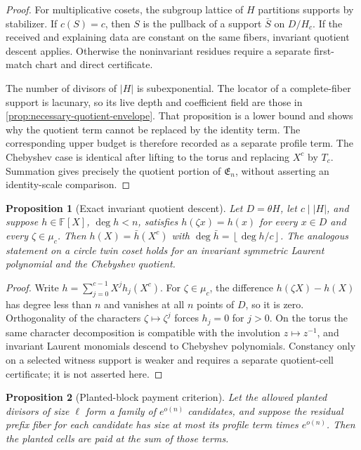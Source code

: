 \documentclass[12pt,a4paper]{amsart}
\numberwithin{equation}{section}
\newtheorem{proposition}[proposition]{Proposition}
\theoremstyle{remark}
\newcommand{\F}{\mathbb F}
\newcommand{\abs}[1]{\lvert #1\rvert}
\newcommand{\floor}[1]{\left\lfloor #1\right\rfloor}
\begin{document}
\begin{proof}
For multiplicative cosets, the subgroup lattice of \(H\) partitions
supports by stabilizer.  If \(c(S)=c\), then \(S\) is the pullback of a
support \(\bar S\) on \(D/H_c\).  If the received and explaining data are
constant on the same fibers, invariant quotient descent applies.  Otherwise the
noninvariant residues require a separate first-match chart and direct
certificate.

The number of divisors of \(\abs H\) is subexponential.  The locator of a
complete-fiber support is lacunary, so its live depth and coefficient field
are those in \cref{prop:necessary-quotient-envelope}.  That proposition is
a lower bound and shows why the quotient term cannot be replaced by the
identity term.  The corresponding upper budget is therefore recorded as a
separate profile term.  The Chebyshev case is identical after lifting to the
torus and replacing \(X^c\) by \(T_c\).  Summation gives precisely the
quotient portion of \(\mathfrak E_n\), without asserting an identity-scale
comparison.
\end{proof}

\begin{proposition}[Exact invariant quotient descent]\label{prop:quotient-descent}
Let \(D=\theta H\), let \(c\mid\abs H\), and suppose
\(h\in\F[X]\), \(\deg h<n\), satisfies \(h(\zeta x)=h(x)\) for every
\(x\in D\) and every \(\zeta\in\mu_c\).  Then
\(h(X)=\bar h(X^c)\) with
\(\deg\bar h=\floor{\deg h/c}\).  The analogous statement on a circle
twin coset holds for an invariant symmetric Laurent polynomial and the
Chebyshev quotient.
\end{proposition}

\begin{proof}
Write \(h=\sum_{j=0}^{c-1}X^jh_j(X^c)\).  For \(\zeta\in\mu_c\), the
difference \(h(\zeta X)-h(X)\) has degree less than \(n\) and vanishes at
all \(n\) points of \(D\), so it is zero.  Orthogonality of the characters
\(\zeta\mapsto\zeta^j\) forces \(h_j=0\) for \(j>0\).  On the torus the
same character decomposition is compatible with the involution
\(z\mapsto z^{-1}\), and invariant Laurent monomials descend to Chebyshev
polynomials.  Constancy only on a selected witness support is weaker and
requires a separate quotient-cell certificate; it is not asserted here.
\end{proof}

\begin{proposition}[Planted-block payment criterion]\label{prop:planted-payment}
Let the allowed planted divisors of size \(\ell\) form a family of
\(e^{o(n)}\) candidates, and suppose the residual prefix fiber for each
candidate has size at most its profile term times \(e^{o(n)}\).  Then the
planted cells are paid at the sum of those terms.
\end{proposition}
\end{document}
